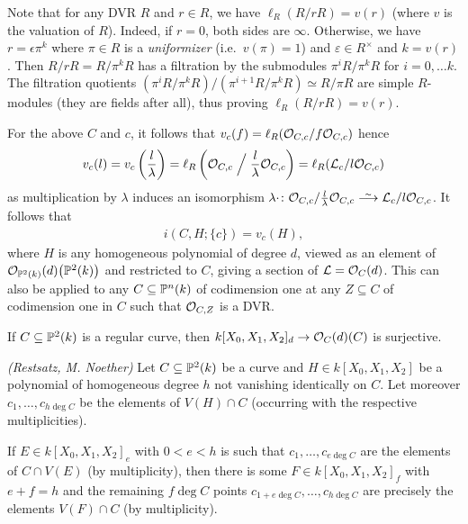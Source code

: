 \documentclass[a4paper,parskip=half,numbers=enddot, DIV=12]{scrreprt}
\begin{document}
Note that for any DVR $R$ and $r\in R$, we have $\ell_R(R/rR) = v(r)$ (where $v$ is the valuation of $R$). Indeed, if
$r=0$, both sides are $\infty$. Otherwise, we have $r=\epsilon\pi^k$ where $\pi\in R$ is a \emph{uniformizer} (i.e.\ $v(\pi)=1$) and $\varepsilon \in R^\times$ and $k=v(r)$. Then $R/rR = R/\pi^kR$ has
a filtration by the submodules $\pi^iR/\pi^kR$ for $i=0,\ldots k$.
The filtration quotients $(\pi^i R/\pi^k R)/(\pi^{i+1} R/\pi^k R) \simeq R/\pi R$ are simple $R$-modules (they are fields after all), thus proving $\ell_R(R/rR)=v(r)$.

For the above $C$ and $c$, it follows that $v_c(f) = \ell_R(\mathcal{O}_{C,c}/f\mathcal{O}_{C,c})$ hence
\begin{align*}
	v_c(l) = v_c\left(\frac l\lambda\right) = \ell_R\left(\mathcal{O}_{C,c}\Bigm/\frac l\lambda\mathcal{O}_{C,c}\right)
	=\ell_R(\mathcal{L}_c/l\mathcal{O}_{C,c}) 
\end{align*}
as multiplication by $\lambda$ induces an isomorphism $\lambda\cdot\colon \Oo_{C,c}/\frac l\lambda \Oo_{C,c}\isomorphism \Ll_c/l\Oo_{C,c}$.
It follows that
\begin{align*}%
i(C,H;\{c\}) = v_c(H),
\end{align*}
where $H$ is any homogeneous polynomial of degree $d$, viewed as an element of
$\mathcal{O}_{\mathbb{P}^2(k)}(d)\big(\mathbb{P}^2(k)\big)$ and restricted to $C$, giving a section
of $\mathcal{L} = \mathcal{O}_C(d)$.
This can also be applied to any $C\subseteq \mathbb{P}^n(k)$ of codimension one at any $Z\subseteq C$ of codimension one in $C$ such that
$\mathcal{O}_{C,Z}$ is a DVR.
\begin{thm}
\begin{alphanumerate}
\item{} If $C\subseteq \mathbb{P}^2(k)$ is a regular curve, then $k[X_0,X_1,X_2]_d\morphism \Oo_C(d)(C)$ is surjective.
\item \emph{(Restsatz, M. Noether)} Let $C\subseteq \mathbb{P}^2(k)$ be a curve and $H\in k[X_0,X_1,X_2]$ be a polynomial of homogeneous degree $h$
not vanishing identically on $C$. Let moreover $c_1,\dotsc,c_{h\deg C}$ be the elements of $V(H)\cap C$ (occurring with the respective multiplicities).

If $E\in k[X_0,X_1,X_2]_e$ with $0<e<h$ is such that $c_1,\dotsc,c_{e\deg C}$ are the elements of $C\cap V(E)$ (by multiplicity),
then there is some $F\in k[X_0,X_1,X_2]_f$ with $e+f=h$
and the remaining $f\deg C$ points $c_{1+e\deg C},\dotsc, c_{h\deg C}$ are precisely the elements $V(F)\cap C$ (by multiplicity).
\end{alphanumerate}
\end{thm}
\end{document}
